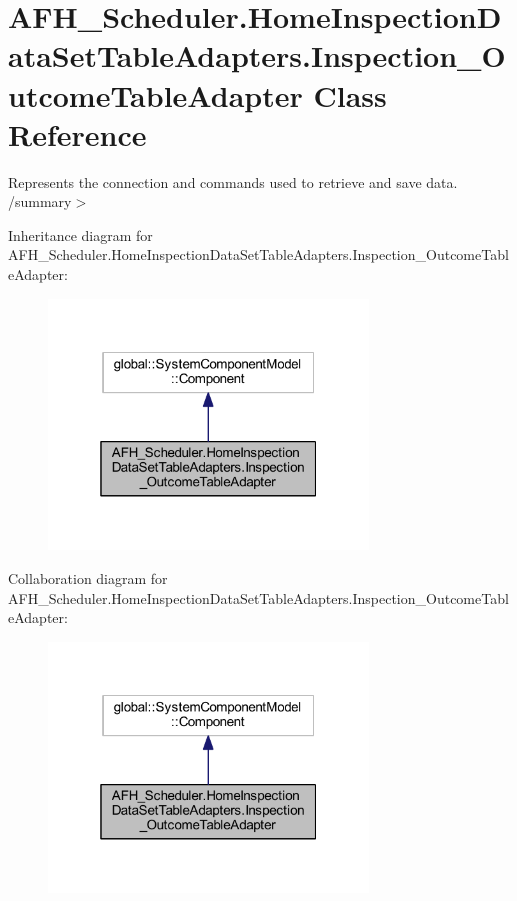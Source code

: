 \section{A\+F\+H\+\_\+\+Scheduler.\+Home\+Inspection\+Data\+Set\+Table\+Adapters.\+Inspection\+\_\+\+Outcome\+Table\+Adapter Class Reference}
\label{class_a_f_h___scheduler_1_1_home_inspection_data_set_table_adapters_1_1_inspection___outcome_table_adapter}


Represents the connection and commands used to retrieve and save data. /summary$>$  




Inheritance diagram for A\+F\+H\+\_\+\+Scheduler.\+Home\+Inspection\+Data\+Set\+Table\+Adapters.\+Inspection\+\_\+\+Outcome\+Table\+Adapter\+:
\nopagebreak
\begin{figure}[H]
\begin{center}
\leavevmode
\includegraphics[width=241pt]{class_a_f_h___scheduler_1_1_home_inspection_data_set_table_adapters_1_1_inspection___outcome_table_adapter__inherit__graph}
\end{center}
\end{figure}


Collaboration diagram for A\+F\+H\+\_\+\+Scheduler.\+Home\+Inspection\+Data\+Set\+Table\+Adapters.\+Inspection\+\_\+\+Outcome\+Table\+Adapter\+:
\nopagebreak
\begin{figure}[H]
\begin{center}
\leavevmode
\includegraphics[width=241pt]{class_a_f_h___scheduler_1_1_home_inspection_data_set_table_adapters_1_1_inspection___outcome_table_adapter__coll__graph}
\end{center}
\end{figure}
